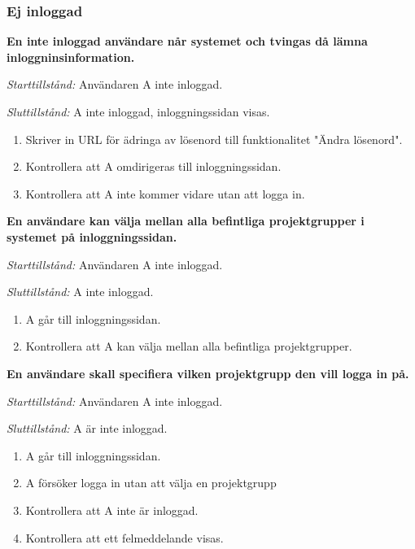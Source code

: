 \documentclass[a4paper]{article}
\begin{document}
\subsubsection{Ej inloggad}
\begin{FT}
\item
\textbf{En inte inloggad användare når systemet och tvingas då lämna inloggninsinformation.}

\emph{Starttillstånd:} Användaren A inte inloggad.

\emph{Sluttillstånd:} A inte inloggad, inloggningssidan visas.

\begin{enumerate}
\item Skriver in URL för ädringa av lösenord till funktionalitet "Ändra lösenord".
\item Kontrollera att A omdirigeras till inloggningssidan.
\item Kontrollera att A inte kommer vidare utan att logga in.
\end{enumerate}

\item
\textbf{En användare kan välja mellan alla befintliga projektgrupper i systemet på inloggningssidan.}

\emph{Starttillstånd:} Användaren A inte inloggad.

\emph{Sluttillstånd:} A inte inloggad.

\begin{enumerate}
\item A går till inloggningssidan.
\item Kontrollera att A kan välja mellan alla befintliga projektgrupper.
\end{enumerate}

\item
\textbf{En användare skall specifiera vilken projektgrupp den vill logga in på.}

\emph{Starttillstånd:} Användaren A inte inloggad.

\emph{Sluttillstånd:} A är inte inloggad.

\begin{enumerate}
\item A går till inloggningssidan.
\item A försöker logga in utan att välja en projektgrupp
\item Kontrollera att A inte är inloggad.
\item Kontrollera att ett felmeddelande visas.
\end{enumerate}


\end{FT}
\end{document}
